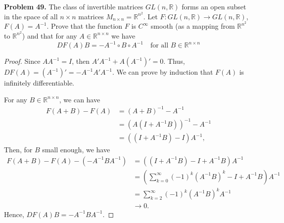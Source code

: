 \documentclass[12pt,leqno]{amsart}
\theoremstyle{definition}
\begin{document}
\noindent
{\bf Problem 49.}
The class of invertible matrices
$GL(n,\mathbb{R})$ forms an open subset in the space of all $n\times n$ matrices $M_{n\times n}=\mathbb{R}^{n^2}$.
Let $F:GL(n,\mathbb{R})\to GL(n,\mathbb{R})$, $F(A)=A^{-1}$.
Prove that the function $F$ is $C^\infty$ smooth (as a mapping from $\mathbb{R}^{n^2}$ to $\mathbb{R}^{n^2}$) and that
for any $A\in\mathbb{R}^{n\times n}$ we have
$$
DF(A)B=-A^{-1}\circ B\circ A^{-1}
\quad
\text{for all $B\in \mathbb{R}^{n\times n}$}
$$
\begin{proof}
Since $AA^{-1} = I$, then $A' A^{-1} + A \left(A^{-1}\right)' = 0$. Thus, $DF(A) = \left(A^{-1}\right)' = - A^{-1} A' A^{-1}$. We can prove by induction that $F(A)$ is infinitely differentiable.

For any $B \in \mathbb{R}^{n\times n}$, we can have 
\begin{align*}
    F(A+B) - F(A) & = \left(A+B\right)^{-1} - A^{-1} \\
    & = \left(A \left(I+A^{-1}B \right) \right)^{-1} - A^{-1} \\
    & = \left(\left(I+A^{-1}B \right) - I \right) A^{-1},
\end{align*}
Then, for $B$ small enough, we have
\begin{align*}
    F(A+B) - F(A) - \left(- A^{-1} B A^{-1}\right) & = \left(\left(I+A^{-1}B \right) - I + A^{-1} B\right) A^{-1} \\
    & = \left(\sum^\infty_{k=0}(-1)^k \left(A^{-1}B\right)^k  - I + A^{-1} B\right) A^{-1} \\
    & = \sum^\infty_{k=2}(-1)^k \left(A^{-1}B\right)^k A^{-1} \\
    & \to 0.
\end{align*}
Hence, $DF(A)B = -A^{-1} B A^{-1}$.
\end{proof}
\end{document}
